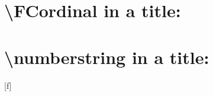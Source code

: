 \documentclass{article}
\newcounter{cnt}
\begin{document}
\setcounter{cnt}{18}
\tableofcontents
\section{\textbackslash FCordinal in a title: }
\section{\textbackslash numberstring in a title: }

\setcounter{cnt}{1}
[f]
\setcounter{cnt}{2}
\setcounter{cnt}{19}
\end{document}
